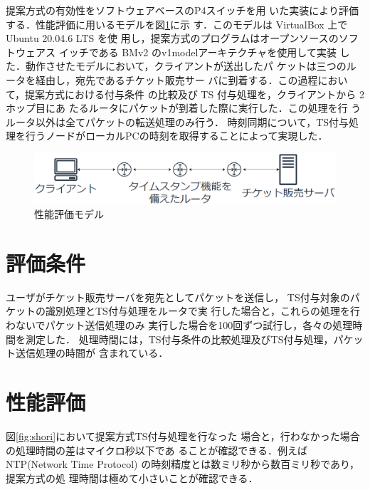 \documentclass[a4j,11pt]{jreport}
\begin{document}
提案方式の有効性をソフトウェアベースのP4スイッチを用
いた実装により評価する．性能評価に用いるモデルを図\ref{fig:seinouhyouka_model}に示
す．このモデルは VirtualBox 上で Ubuntu 20.04.6 LTS を使
用し，提案方式のプログラムはオープンソースのソフトウェアス
イッチである BMv2 のv1modelアーキテクチャを使用して実装
した．動作させたモデルにおいて，クライアントが送出したパ
ケットは三つのルータを経由し，宛先であるチケット販売サー
バに到着する．この過程において，提案方式における付与条件
の比較及び TS 付与処理を，クライアントから 2 ホップ目にあ
たるルータにパケットが到着した際に実行した．この処理を行
うルータ以外は全てパケットの転送処理のみ行う．
時刻同期について，TS付与処理を行うノードがローカルPCの時刻を取得することによって実現した．


\begin{figure}[htbp]
  \centering
  \includegraphics[scale=0.5]{data/soturon_network_koseizu2.eps}
  \vspace{0mm}
  \caption{性能評価モデル}
  \label{fig:seinouhyouka_model}
\end{figure}

\section{評価条件}
ユーザがチケット販売サーバを宛先としてパケットを送信し，
TS付与対象のパケットの識別処理とTS付与処理をルータで実
行した場合と，これらの処理を行わないでパケット送信処理のみ
実行した場合を100回ずつ試行し，各々の処理時間を測定した．
処理時間には，TS付与条件の比較処理及びTS付与処理，パケット送信処理の時間が
含まれている．

\section{性能評価}
図\ref{fig:shori}において提案方式TS付与処理を行なった
場合と，行わなかった場合の処理時間の差はマイクロ秒以下であ
ることが確認できる．例えばNTP(Network Time Protocol)
の時刻精度とは数ミリ秒から数百ミリ秒であり，提案方式の処
理時間は極めて小さいことが確認できる．
\end{document}
